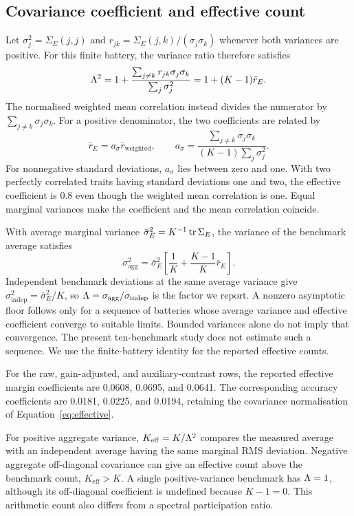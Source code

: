 \subsection{Covariance coefficient and effective count}
Let $\sigma_j^2=\Sigma_E(j,j)$ and $r_{jk}=\Sigma_E(j,k)/(\sigma_j\sigma_k)$ whenever both variances are positive. For this finite battery, the variance ratio therefore satisfies
\begin{equation}
\Lambda^2=1+\frac{\sum_{j\ne k}r_{jk}\sigma_j\sigma_k}{\sum_j\sigma_j^2}
=1+(K-1)\bar r_E.
\end{equation}
The normalised weighted mean correlation instead divides the numerator by $\sum_{j\ne k}\sigma_j\sigma_k$. For a positive denominator, the two coefficients are related by
\begin{equation}
\bar r_E=a_\sigma\bar r_{\mathrm{weighted}},\qquad
a_\sigma=\frac{\sum_{j\ne k}\sigma_j\sigma_k}{(K-1)\sum_j\sigma_j^2}.
\end{equation}
For nonnegative standard deviations, $a_\sigma$ lies between zero and one. With two perfectly correlated traits having standard deviations one and two, the effective coefficient is 0.8 even though the weighted mean correlation is one. Equal marginal variances make the coefficient and the mean correlation coincide.

With average marginal variance $\bar\sigma_E^2=K^{-1}\operatorname{tr}\Sigma_E$, the variance of the benchmark average satisfies
\begin{equation}
\sigma_{\mathrm{agg}}^2=\bar\sigma_E^2\left[\frac1K+\frac{K-1}{K}\bar r_E\right].
\end{equation}
Independent benchmark deviations at the same average variance give $\sigma_{\mathrm{indep}}^2=\bar\sigma_E^2/K$, so $\Lambda=\sigma_{\mathrm{agg}}/\sigma_{\mathrm{indep}}$ is the factor we report.
A nonzero asymptotic floor follows only for a sequence of batteries whose average variance and effective coefficient converge to suitable limits. Bounded variances alone do not imply that convergence. The present ten-benchmark study does not estimate such a sequence. We use the finite-battery identity for the reported effective counts.

For the raw, gain-adjusted, and auxiliary-contrast rows, the reported effective margin coefficients are 0.0608, 0.0695, and 0.0641. The corresponding accuracy coefficients are 0.0181, 0.0225, and 0.0194, retaining the covariance normalisation of Equation~\ref{eq:effective}.

For positive aggregate variance, $K_{\mathrm{eff}}=K/\Lambda^2$ compares the measured average with an independent average having the same marginal RMS deviation. Negative aggregate off-diagonal covariance can give an effective count above the benchmark count, $K_{\mathrm{eff}}>K$. A single positive-variance benchmark has $\Lambda=1$, although its off-diagonal coefficient is undefined because $K-1=0$. This arithmetic count also differs from a spectral participation ratio.

